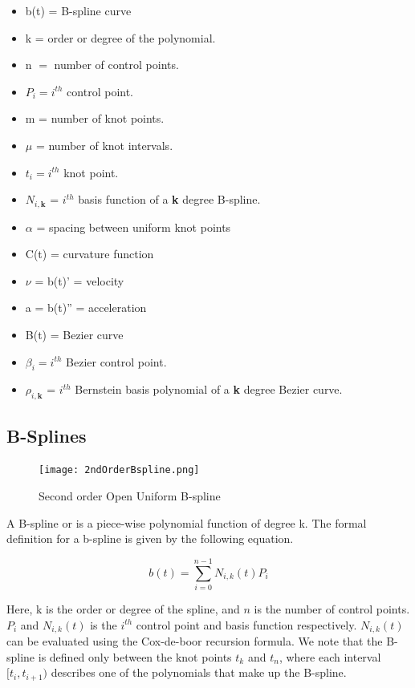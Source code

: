 \documentclass{article}
\begin{document}
\begin{itemize}
  \item[] b(t) = B-spline curve
  \item[] k = order or degree of the polynomial.
  \item[] n \(=\) number of control points.
  \item[] \(P_i = i^{th}\) control point.
  \item[] m = number of knot points.
  \item[] \(\mu\) = number of knot intervals.
  \item[] \(t_i = i^{th}\) knot point.
  \item[] \(N_{i , \textbf{k}}\) = \(i^{th}\) basis function of a \textbf{k} degree B-spline.
  \item[] \(\alpha\) = spacing between uniform knot points
  \item[] C(t) = curvature function
  \item[] \(\nu\) = b(t)' = velocity
  \item[] a = b(t)'' = acceleration
  \item[] B(t) = Bezier curve
  \item[] \(\beta_i = i^{th}\) Bezier control point.
  \item[] \(\rho_{i , \textbf{k}}\) = \(i^{th}\) Bernstein basis polynomial of a \textbf{k} degree Bezier curve.
\end{itemize}

\subsection{B-Splines}

\begin{figure}[H]
\begin{center}
\texttt{[image: 2ndOrderBspline.png]}
\end{center}
\caption{Second order Open Uniform B-spline}
\label{Fig:2ndOrderBspline}
\end{figure}

 A B-spline or  is a piece-wise polynomial function of degree k. The formal definition for a b-spline is given by the following equation.
 
   \begin{equation} \label{eq:B-Spline equation}
      b(t) = \sum^{n-1}_{i=0} N_{i,k}(t) P_i
  \end{equation}
  
  Here, k is the order or degree of the spline, and \(n\) is the number of control points. \(P_i\) and \(N_{i,k}(t)\) is the \(i^{th}\) control point and basis function respectively. \(N_{i,k}(t)\) can be evaluated using the Cox-de-boor recursion formula. We note that the B-spline is defined only between the knot points \(t_k\) and \(t_n\), where each interval \([t_i , t_{i+1})\) describes one of the polynomials that make up the B-spline.
\end{document}
